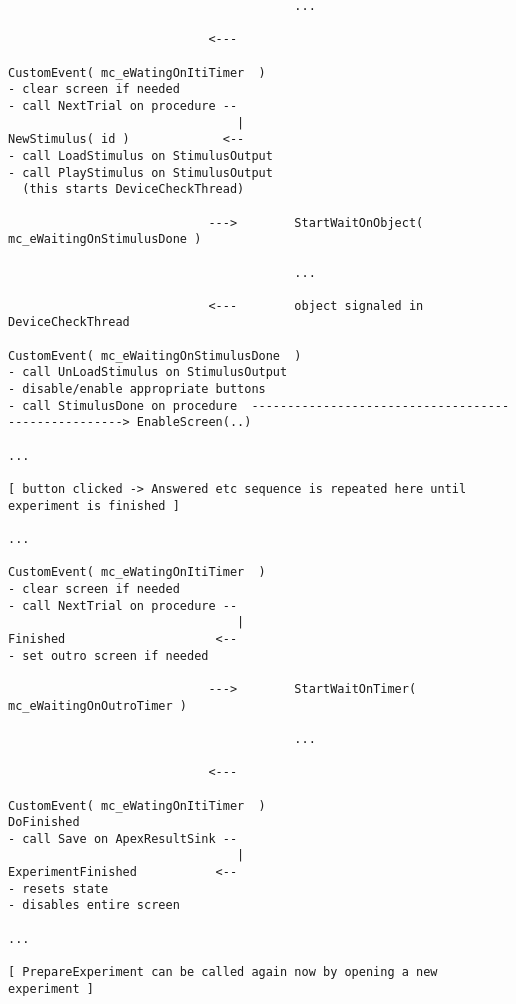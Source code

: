 \documentclass[a4paper,12pt]{article}
\begin{document}
\begin{landscape}
\begin{verbatim}
                                        ...

                            <---

CustomEvent( mc_eWatingOnItiTimer  )
- clear screen if needed
- call NextTrial on procedure --
                                |
NewStimulus( id )             <--
- call LoadStimulus on StimulusOutput
- call PlayStimulus on StimulusOutput
  (this starts DeviceCheckThread)

                            --->        StartWaitOnObject( mc_eWaitingOnStimulusDone )

                                        ...

                            <---        object signaled in DeviceCheckThread

CustomEvent( mc_eWaitingOnStimulusDone  )
- call UnLoadStimulus on StimulusOutput
- disable/enable appropriate buttons
- call StimulusDone on procedure  ----------------------------------------------------> EnableScreen(..)

...

[ button clicked -> Answered etc sequence is repeated here until experiment is finished ]

...

CustomEvent( mc_eWatingOnItiTimer  )
- clear screen if needed
- call NextTrial on procedure --
                                |
Finished                     <--
- set outro screen if needed

                            --->        StartWaitOnTimer( mc_eWaitingOnOutroTimer )

                                        ...

                            <---

CustomEvent( mc_eWatingOnItiTimer  )
DoFinished
- call Save on ApexResultSink --
                                |
ExperimentFinished           <--
- resets state
- disables entire screen

...

[ PrepareExperiment can be called again now by opening a new experiment ]

\end{verbatim}
\end{landscape}
\end{document}
